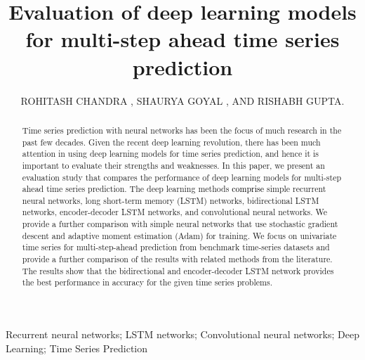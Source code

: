 \documentclass{ieeeaccess}
\begin{document}

\title{Evaluation of deep  learning models for multi-step ahead time series prediction}
\author{\uppercase{Rohitash Chandra} ,
\uppercase{Shaurya Goyal , and Rishabh Gupta}. }

\address[1]{School of Mathematics and Statistics, University of New South Wales,  Sydney, NSW 2052, Australia}
\address[2]{ Department of Mathematics, Indian Institute of Technology, Delhi, 110016 , India  }
\address[3]{Department of Geology and Geophysics, Indian Institute of Technology,Kharagpur, 721302 , India}
 





\begin{abstract} 
Time series prediction with neural networks has been the focus of much research in the past few decades. Given the recent deep learning revolution, there has been much attention in using deep learning models for time series prediction, and hence it is important to evaluate their strengths and weaknesses.  In this paper, we present an evaluation study that compares the performance of deep learning models for multi-step ahead time series prediction.  The deep learning methods \textcolor{black}{comprise} simple recurrent neural networks,   long short-term memory (LSTM) networks, bidirectional  LSTM networks,  encoder-decoder LSTM networks, and convolutional neural networks. We provide a further comparison with simple neural networks that use stochastic gradient descent and adaptive moment estimation (Adam) for training. We focus on univariate time series for multi-step-ahead prediction from benchmark time-series datasets and provide a further comparison of the results with related methods from the literature. The results show that the bidirectional and encoder-decoder LSTM network provides the best performance in accuracy for the given time series problems. 
  

\end{abstract}

\begin{keywords}
 Recurrent neural networks; LSTM networks; Convolutional neural networks;  Deep Learning; Time Series Prediction
\end{keywords}
\end{document}
